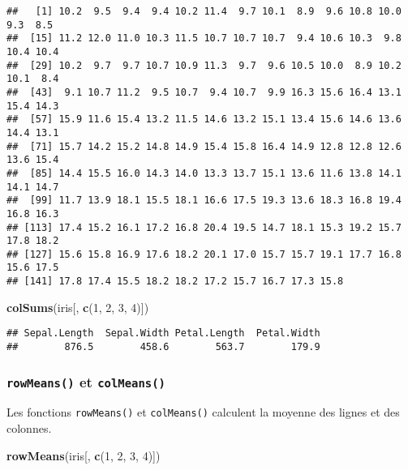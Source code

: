 \documentclass[]{book}
\newenvironment{Shaded}{\begin{snugshade}}{\end{snugshade}}
\newcommand{\KeywordTok}[1]{\textcolor[rgb]{0.13,0.29,0.53}{\textbf{#1}}}
\newcommand{\DecValTok}[1]{\textcolor[rgb]{0.00,0.00,0.81}{#1}}
\newcommand{\NormalTok}[1]{#1}
\theoremstyle{definition}
\theoremstyle{definition}
\theoremstyle{definition}
\theoremstyle{remark}
\begin{document}
\begin{verbatim}
##   [1] 10.2  9.5  9.4  9.4 10.2 11.4  9.7 10.1  8.9  9.6 10.8 10.0  9.3  8.5
##  [15] 11.2 12.0 11.0 10.3 11.5 10.7 10.7 10.7  9.4 10.6 10.3  9.8 10.4 10.4
##  [29] 10.2  9.7  9.7 10.7 10.9 11.3  9.7  9.6 10.5 10.0  8.9 10.2 10.1  8.4
##  [43]  9.1 10.7 11.2  9.5 10.7  9.4 10.7  9.9 16.3 15.6 16.4 13.1 15.4 14.3
##  [57] 15.9 11.6 15.4 13.2 11.5 14.6 13.2 15.1 13.4 15.6 14.6 13.6 14.4 13.1
##  [71] 15.7 14.2 15.2 14.8 14.9 15.4 15.8 16.4 14.9 12.8 12.8 12.6 13.6 15.4
##  [85] 14.4 15.5 16.0 14.3 14.0 13.3 13.7 15.1 13.6 11.6 13.8 14.1 14.1 14.7
##  [99] 11.7 13.9 18.1 15.5 18.1 16.6 17.5 19.3 13.6 18.3 16.8 19.4 16.8 16.3
## [113] 17.4 15.2 16.1 17.2 16.8 20.4 19.5 14.7 18.1 15.3 19.2 15.7 17.8 18.2
## [127] 15.6 15.8 16.9 17.6 18.2 20.1 17.0 15.7 15.7 19.1 17.7 16.8 15.6 17.5
## [141] 17.8 17.4 15.5 18.2 18.2 17.2 15.7 16.7 17.3 15.8
\end{verbatim}

\begin{Shaded}
\begin{Highlighting}[]
\KeywordTok{colSums}\NormalTok{(iris[, }\KeywordTok{c}\NormalTok{(}\DecValTok{1}\NormalTok{, }\DecValTok{2}\NormalTok{, }\DecValTok{3}\NormalTok{, }\DecValTok{4}\NormalTok{)])}
\end{Highlighting}
\end{Shaded}

\begin{verbatim}
## Sepal.Length  Sepal.Width Petal.Length  Petal.Width 
##        876.5        458.6        563.7        179.9
\end{verbatim}

\subsubsection{\texorpdfstring{\texttt{rowMeans()} et
\texttt{colMeans()}}{rowMeans() et colMeans()}}\label{l015rowmeans}

Les fonctions \texttt{rowMeans()} et \texttt{colMeans()} calculent la
moyenne des lignes et des colonnes.

\begin{Shaded}
\begin{Highlighting}[]
\KeywordTok{rowMeans}\NormalTok{(iris[, }\KeywordTok{c}\NormalTok{(}\DecValTok{1}\NormalTok{, }\DecValTok{2}\NormalTok{, }\DecValTok{3}\NormalTok{, }\DecValTok{4}\NormalTok{)])}
\end{Highlighting}
\end{Shaded}
\end{document}
